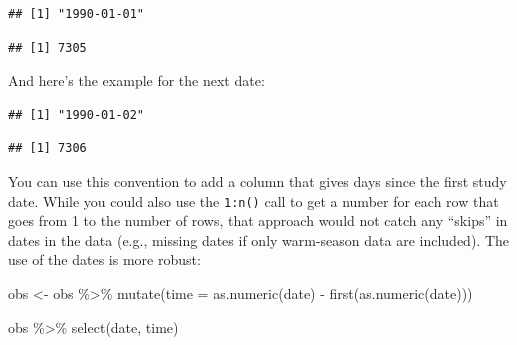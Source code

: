 \documentclass[
]{book}
\newenvironment{Shaded}{\begin{snugshade}}{\end{snugshade}}
\newcommand{\AttributeTok}[1]{\textcolor[rgb]{0.77,0.63,0.00}{#1}}
\newcommand{\DecValTok}[1]{\textcolor[rgb]{0.00,0.00,0.81}{#1}}
\newcommand{\FunctionTok}[1]{\textcolor[rgb]{0.00,0.00,0.00}{#1}}
\newcommand{\NormalTok}[1]{#1}
\newcommand{\OtherTok}[1]{\textcolor[rgb]{0.56,0.35,0.01}{#1}}
\newcommand{\SpecialCharTok}[1]{\textcolor[rgb]{0.00,0.00,0.00}{#1}}
\begin{document}
\begin{verbatim}
## [1] "1990-01-01"
\end{verbatim}

\begin{Shaded}
\end{Shaded}

\begin{verbatim}
## [1] 7305
\end{verbatim}

And here's the example for the next date:

\begin{Shaded}
\end{Shaded}

\begin{verbatim}
## [1] "1990-01-02"
\end{verbatim}

\begin{Shaded}
\end{Shaded}

\begin{verbatim}
## [1] 7306
\end{verbatim}

You can use this convention to add a column that gives days since the first
study date. While you could also use the \texttt{1:n()} call to get a number for
each row that goes from 1 to the number of rows, that approach would not
catch any ``skips'' in dates in the data (e.g., missing dates if only warm-season
data are included). The use of the dates is more robust:

\begin{Shaded}
\begin{Highlighting}[]
\NormalTok{obs }\OtherTok{\textless{}{-}}\NormalTok{ obs }\SpecialCharTok{\%\textgreater{}\%} 
  \FunctionTok{mutate}\NormalTok{(}\AttributeTok{time =} \FunctionTok{as.numeric}\NormalTok{(date) }\SpecialCharTok{{-}} \FunctionTok{first}\NormalTok{(}\FunctionTok{as.numeric}\NormalTok{(date)))}

\NormalTok{obs }\SpecialCharTok{\%\textgreater{}\%} 
  \FunctionTok{select}\NormalTok{(date, time)}
\end{Highlighting}
\end{Shaded}
\end{document}
